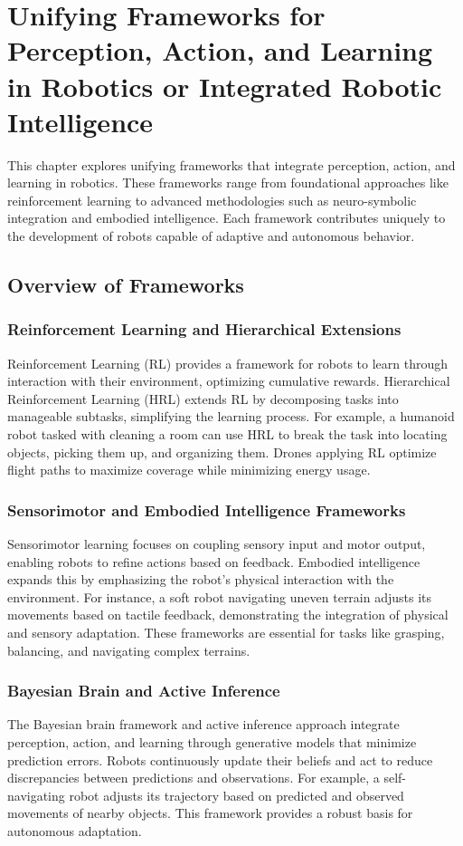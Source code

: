 \chapter{Unifying Frameworks for Perception, Action, and Learning in Robotics or Integrated Robotic Intelligence}
This chapter explores unifying frameworks that integrate perception, action, and learning in robotics. These frameworks range from foundational approaches like reinforcement learning to advanced methodologies such as neuro-symbolic integration and embodied intelligence. Each framework contributes uniquely to the development of robots capable of adaptive and autonomous behavior.

\section{Overview of Frameworks}
    \subsection{Reinforcement Learning and Hierarchical Extensions}
    Reinforcement Learning (RL) provides a framework for robots to learn through interaction with their environment, optimizing cumulative rewards. Hierarchical Reinforcement Learning (HRL) extends RL by decomposing tasks into manageable subtasks, simplifying the learning process. For example, a humanoid robot tasked with cleaning a room can use HRL to break the task into locating objects, picking them up, and organizing them. Drones applying RL optimize flight paths to maximize coverage while minimizing energy usage.  

    \subsection{Sensorimotor and Embodied Intelligence Frameworks}
    Sensorimotor learning focuses on coupling sensory input and motor output, enabling robots to refine actions based on feedback. Embodied intelligence expands this by emphasizing the robot's physical interaction with the environment. For instance, a soft robot navigating uneven terrain adjusts its movements based on tactile feedback, demonstrating the integration of physical and sensory adaptation. These frameworks are essential for tasks like grasping, balancing, and navigating complex terrains.  


    \subsection{Bayesian Brain and Active Inference}
    The Bayesian brain framework and active inference approach integrate perception, action, and learning through generative models that minimize prediction errors. Robots continuously update their beliefs and act to reduce discrepancies between predictions and observations. For example, a self-navigating robot adjusts its trajectory based on predicted and observed movements of nearby objects. This framework provides a robust basis for autonomous adaptation. 

